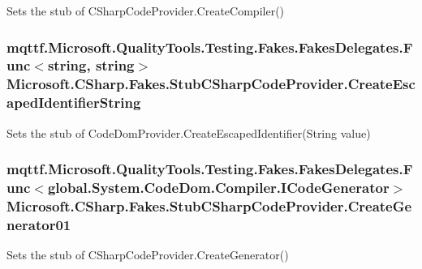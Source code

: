 Sets the stub of C\-Sharp\-Code\-Provider.\-Create\-Compiler()

\hypertarget{class_microsoft_1_1_c_sharp_1_1_fakes_1_1_stub_c_sharp_code_provider_a161efa5e8158aadf5c0b24359a73252a}{
\subsubsection[{Create\-Escaped\-Identifier\-String}]{\setlength{\rightskip}{0pt plus 5cm}mqttf.\-Microsoft.\-Quality\-Tools.\-Testing.\-Fakes.\-Fakes\-Delegates.\-Func$<$string, string$>$ Microsoft.\-C\-Sharp.\-Fakes.\-Stub\-C\-Sharp\-Code\-Provider.\-Create\-Escaped\-Identifier\-String}}\label{class_microsoft_1_1_c_sharp_1_1_fakes_1_1_stub_c_sharp_code_provider_a161efa5e8158aadf5c0b24359a73252a}


Sets the stub of Code\-Dom\-Provider.\-Create\-Escaped\-Identifier(\-String value)

\hypertarget{class_microsoft_1_1_c_sharp_1_1_fakes_1_1_stub_c_sharp_code_provider_af26eef64d60e9b09f2e7cd10586fddde}{
\subsubsection[{Create\-Generator01}]{\setlength{\rightskip}{0pt plus 5cm}mqttf.\-Microsoft.\-Quality\-Tools.\-Testing.\-Fakes.\-Fakes\-Delegates.\-Func$<$global.\-System.\-Code\-Dom.\-Compiler.\-I\-Code\-Generator$>$ Microsoft.\-C\-Sharp.\-Fakes.\-Stub\-C\-Sharp\-Code\-Provider.\-Create\-Generator01}}\label{class_microsoft_1_1_c_sharp_1_1_fakes_1_1_stub_c_sharp_code_provider_af26eef64d60e9b09f2e7cd10586fddde}


Sets the stub of C\-Sharp\-Code\-Provider.\-Create\-Generator()

